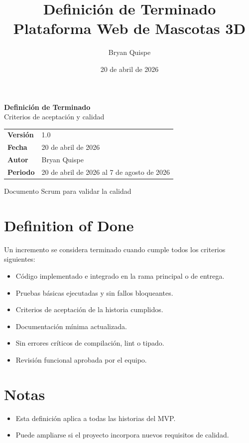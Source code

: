 \documentclass[12pt,a4paper]{article}
\title{\Huge\textbf{Definición de Terminado}\\[0.3em]\Large Plataforma Web de Mascotas 3D}
\author{Bryan Quispe}
\date{20 de abril de 2026}
\begin{document}
\begin{titlepage}
\centering
\vspace*{1.8cm}
{\Huge\bfseries\color{PrimaryBlue} Definición de Terminado\\[0.35em]}
{\LARGE Criterios de aceptación y calidad\\[1.2cm]}

\begin{tabular}{p{5cm} p{8cm}}
\rowcolor{SoftGray}
\textbf{Versión} & 1.0 \\
\textbf{Fecha} & 20 de abril de 2026 \\
\textbf{Autor} & Bryan Quispe \\
\textbf{Periodo} & 20 de abril de 2026 al 7 de agosto de 2026 \\
\end{tabular}

\vfill
{\large Documento Scrum para validar la calidad}
\end{titlepage}

\section{Definition of Done}
Un incremento se considera terminado cuando cumple todos los criterios siguientes:
\begin{itemize}[leftmargin=*]
    \item Código implementado e integrado en la rama principal o de entrega.
    \item Pruebas básicas ejecutadas y sin fallos bloqueantes.
    \item Criterios de aceptación de la historia cumplidos.
    \item Documentación mínima actualizada.
    \item Sin errores críticos de compilación, lint o tipado.
    \item Revisión funcional aprobada por el equipo.
\end{itemize}

\section{Notas}
\begin{itemize}[leftmargin=*]
    \item Esta definición aplica a todas las historias del MVP.
    \item Puede ampliarse si el proyecto incorpora nuevos requisitos de calidad.
\end{itemize}
\end{document}
